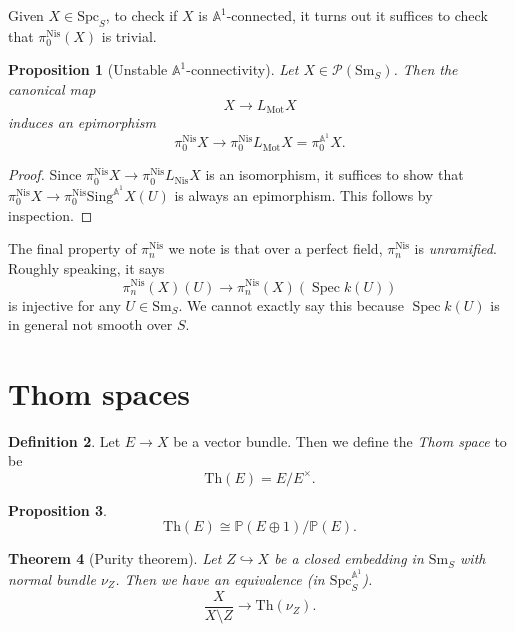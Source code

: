 \documentclass{shortart}
\newtheorem{thm}{Theorem}[section]
\newtheorem{prop}[thm]{Proposition}
\theoremstyle{definition}
\newtheorem{defi}[thm]{Definition}
\newcommand\Sm{\mathrm{Sm}}
\newcommand\Spc{\mathrm{Spc}}
\newcommand\Sing{\mathrm{Sing}}
\newcommand\Nis{\mathrm{Nis}}
\newcommand\Th{\mathrm{Th}}
\newcommand\Pre{\mathcal{P}}
\renewcommand\P{\mathbb{P}}
\newcommand\A{\mathbb{A}}
\newcommand\Mot{\mathrm{Mot}}
\DeclareMathOperator\Spec{Spec}
\begin{document}
Given $X \in \Spc_S$, to check if $X$ is $\A^1$-connected, it turns out it suffices to check that $\pi_0^{\Nis}(X)$ is trivial.
\begin{prop}[Unstable $\A^1$-connectivity]
  Let $X \in \Pre(\Sm_S)$. Then the canonical map
  \[
    X \to L_{\Mot}X
  \]
  induces an epimorphism
  \[
    \pi_0^{\Nis}X \to \pi_0^{\Nis} L_{\Mot} X = \pi_0^{\A^1} X.
  \]
\end{prop}

\begin{proof}
  Since $\pi_0^{\Nis} X \to \pi_0^{\Nis} L_{\Nis} X$ is an isomorphism, it suffices to show that $\pi_0^{\Nis} X \to \pi_0^{\Nis} \Sing^{\A^1} X(U)$ is always an epimorphism. This follows by inspection.
\end{proof}

The final property of $\pi_n^{\Nis}$ we note is that over a perfect field, $\pi_n^{\Nis}$ is \emph{unramified}. Roughly speaking, it says
\[
  \pi_n^{\Nis}(X)(U) \to \pi_n^{\Nis}(X)(\Spec k(U))
\]
is injective for any $U \in \Sm_S$. We cannot exactly say this because $\Spec k(U)$ is in general not smooth over $S$.

\section{Thom spaces}\label{chapter:thom}
\begin{defi}
  Let $E \to X$ be a vector bundle. Then we define the \emph{Thom space} to be
  \[
    \Th(E) = E / E^\times.
  \]
\end{defi}

\begin{prop}
  \[  
    \Th(E) \cong \P(E \oplus 1)/\P(E).
  \]
\end{prop}

\begin{thm}[Purity theorem]
  Let $Z \hookrightarrow X$ be a closed embedding in $\Sm_S$ with normal bundle $\nu_Z$. Then we have an equivalence (in $\Spc_S^{\A^1}$).
  \[
    \frac{X}{X \setminus Z} \to \Th(\nu_Z).
  \]
\end{thm}
\end{document}
